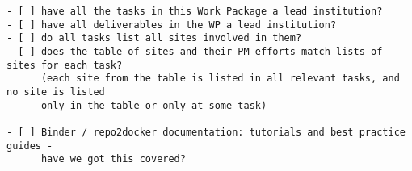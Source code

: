 \begin{draft}
\begin{verbatim}
- [ ] have all the tasks in this Work Package a lead institution?
- [ ] have all deliverables in the WP a lead institution?
- [ ] do all tasks list all sites involved in them?
- [ ] does the table of sites and their PM efforts match lists of sites for each task?
      (each site from the table is listed in all relevant tasks, and no site is listed
      only in the table or only at some task)

- [ ] Binder / repo2docker documentation: tutorials and best practice guides -
      have we got this covered?
\end{verbatim}
\end{draft}

